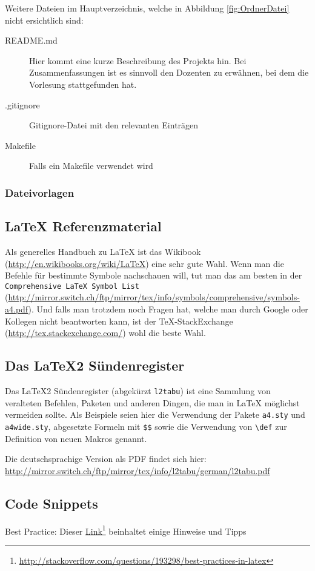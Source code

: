 Weitere Dateien im Hauptverzeichnis, welche in Abbildung \ref{fig:OrdnerDatei} nicht ersichtlich sind:
\begin{description}
  \item[README.md] Hier kommt eine kurze Beschreibung des Projekts hin. Bei Zusammenfassungen ist es sinnvoll den Dozenten zu erwähnen,
  	bei dem die Vorlesung stattgefunden hat.
  \item[.gitignore] Gitignore-Datei mit den relevanten Einträgen
  \item[Makefile]	Falls ein Makefile verwendet wird
\end{description}

\subsubsection{Dateivorlagen}


\subsection{\LaTeX{} Referenzmaterial}

Als generelles Handbuch zu \LaTeX{} ist das  Wikibook (\url{http://en.wikibooks.org/wiki/LaTeX})
eine sehr gute Wahl. Wenn man die Befehle für bestimmte Symbole nachschauen will, tut man das am
besten in der \texttt{Comprehensive \LaTeX{} Symbol List}
(\url{http://mirror.switch.ch/ftp/mirror/tex/info/symbols/comprehensive/symbols-a4.pdf}). Und falls
man trotzdem noch Fragen hat, welche man durch Google oder Kollegen nicht beantworten kann, ist der
\TeX-StackExchange (\url{http://tex.stackexchange.com/}) wohl die beste Wahl.

\subsection{Das \LaTeX2 Sündenregister}

Das \LaTeX2 Sündenregister (abgekürzt \texttt{l2tabu}) ist eine Sammlung von veralteten Befehlen,
Paketen und anderen Dingen, die man in \LaTeX{} möglichst vermeiden sollte. Als Beispiele seien hier
die Verwendung der Pakete \texttt{a4.sty} und \texttt{a4wide.sty}, abgesetzte Formeln mit
\texttt{\$\$} sowie die Verwendung von \texttt{\textbackslash def} zur Definition von neuen Makros genannt.

Die deutschsprachige Version als PDF findet sich hier:
\url{http://mirror.switch.ch/ftp/mirror/tex/info/l2tabu/german/l2tabu.pdf}

\subsection{Code Snippets}
Best Practice: Dieser \href{http://stackoverflow.com/questions/193298/best-practices-in-latex}{Link}\footnote{\url{http://stackoverflow.com/questions/193298/best-practices-in-latex}} 
beinhaltet einige Hinweise und Tipps

